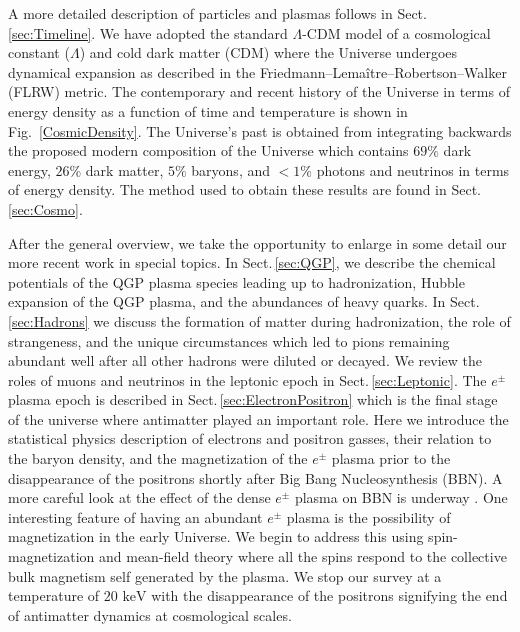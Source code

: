 \documentclass[universe,article,submit,moreauthors,pdftex,a4paper]{Definitions/mdpi}
\newcommand{\keV}{\text{ keV}}
\newcommand*{\rf}[1]{Fig.~{\ref{#1}}}
\newcommand*{\rsec}[1]{Sect.\,{\ref{#1}}}
\begin{document}
A more detailed description of particles and plasmas follows in \rsec{sec:Timeline}. We have adopted the standard $\Lambda$-CDM model of a cosmological constant ($\Lambda$) and cold dark matter (CDM) where the Universe undergoes dynamical expansion as described in the Friedmann–Lemaître–Robertson–Walker (FLRW) metric. The contemporary and recent history of the Universe in terms of energy density as a function of time and temperature is shown in \rf{CosmicDensity}. The Universe's past is obtained from integrating backwards the proposed modern composition of the Universe which contains $69\%$ dark energy, $26\%$ dark matter, $5\%$ baryons, and $<1\%$ photons and neutrinos in terms of energy density. The method used to obtain these results are found in \rsec{sec:Cosmo}.

After the general overview, we take the opportunity to enlarge in some detail our more recent work in special topics. In \rsec{sec:QGP}, we describe the chemical potentials of the QGP plasma species leading up to hadronization, Hubble expansion of the QGP plasma, and the abundances of heavy quarks. In \rsec{sec:Hadrons} we discuss the formation of matter during hadronization, the role of strangeness, and the unique circumstances which led to pions remaining abundant well after all other hadrons were diluted or decayed. We review the roles of muons and neutrinos in the leptonic epoch in \rsec{sec:Leptonic}. The $e^{\pm}$ plasma epoch is described in \rsec{sec:ElectronPositron} which is the final stage of the universe where antimatter played an important role. Here we introduce the statistical physics description of electrons and positron gasses, their relation to the baryon density, and the magnetization of the $e^{\pm}$ plasma prior to the disappearance of the positrons shortly after Big Bang Nucleosynthesis (BBN). A more careful look at the effect of the dense $e^{\pm}$ plasma on BBN is underway \cite{Chris:2023abc}. One interesting feature of having an abundant $e^{\pm}$ plasma is the possibility of magnetization in the early Universe. We begin to address this using spin-magnetization and mean-field theory where all the spins respond to the collective bulk magnetism self generated by the plasma. We stop our survey at a temperature of $20\keV$ with the disappearance of the positrons signifying the end of antimatter dynamics at cosmological scales.
\end{document}
